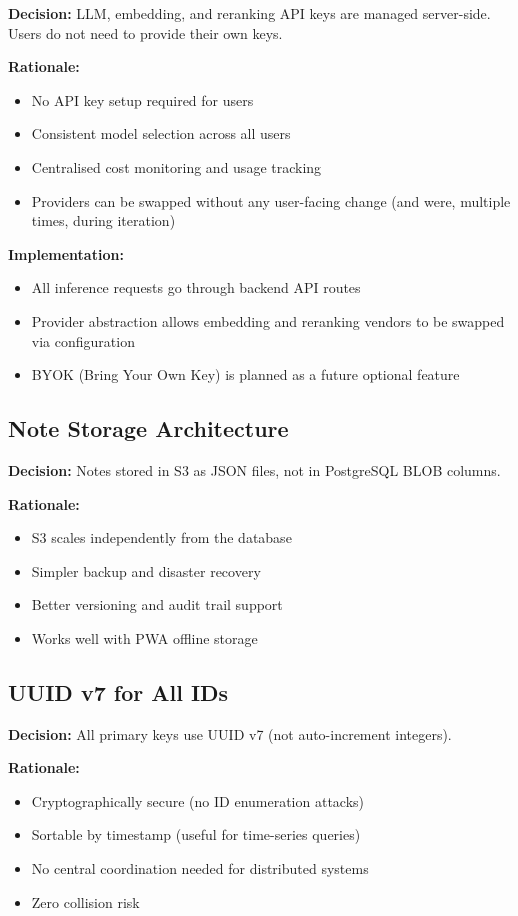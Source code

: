 \documentclass[12pt,a4paper]{article}
\begin{document}
\textbf{Decision:} LLM, embedding, and reranking API keys are managed server-side. Users do not need to provide their own keys.

\textbf{Rationale:}
\begin{itemize}
    \item No API key setup required for users
    \item Consistent model selection across all users
    \item Centralised cost monitoring and usage tracking
    \item Providers can be swapped without any user-facing change (and were, multiple times, during iteration)
\end{itemize}

\textbf{Implementation:}
\begin{itemize}
    \item All inference requests go through backend API routes
    \item Provider abstraction allows embedding and reranking vendors to be swapped via configuration
    \item BYOK (Bring Your Own Key) is planned as a future optional feature
\end{itemize}

\subsection{Note Storage Architecture}

\textbf{Decision:} Notes stored in S3 as JSON files, not in PostgreSQL BLOB columns.

\textbf{Rationale:}
\begin{itemize}
    \item S3 scales independently from the database
    \item Simpler backup and disaster recovery
    \item Better versioning and audit trail support
    \item Works well with PWA offline storage
\end{itemize}

\subsection{UUID v7 for All IDs}

\textbf{Decision:} All primary keys use UUID v7 (not auto-increment integers).

\textbf{Rationale:}
\begin{itemize}
    \item Cryptographically secure (no ID enumeration attacks)
    \item Sortable by timestamp (useful for time-series queries)
    \item No central coordination needed for distributed systems
    \item Zero collision risk
\end{itemize}
\end{document}
